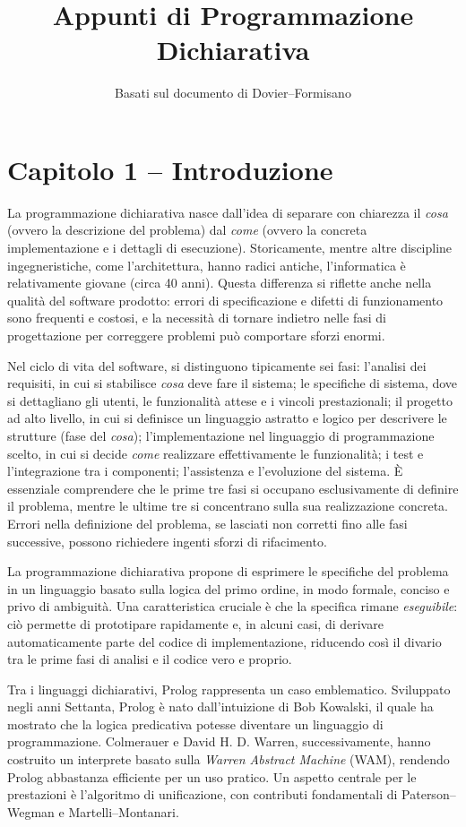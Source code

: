 \documentclass[12pt]{article}
\title{Appunti di Programmazione Dichiarativa}
\author{Basati sul documento di Dovier–Formisano}
\date{}
\begin{document}
\maketitle

\section*{Capitolo 1 – Introduzione}

La programmazione dichiarativa nasce dall'idea di separare con chiarezza il \emph{cosa} (ovvero la descrizione del problema) dal \emph{come} (ovvero la concreta implementazione e i dettagli di esecuzione). Storicamente, mentre altre discipline ingegneristiche, come l'architettura, hanno radici antiche, l'informatica è relativamente giovane (circa 40 anni). Questa differenza si riflette anche nella qualità del software prodotto: errori di specificazione e difetti di funzionamento sono frequenti e costosi, e la necessità di tornare indietro nelle fasi di progettazione per correggere problemi può comportare sforzi enormi. 

Nel ciclo di vita del software, si distinguono tipicamente sei fasi: 
l'analisi dei requisiti, in cui si stabilisce \emph{cosa} deve fare il sistema; 
le specifiche di sistema, dove si dettagliano gli utenti, le funzionalità attese e i vincoli prestazionali; 
il progetto ad alto livello, in cui si definisce un linguaggio astratto e logico per descrivere le strutture (fase del \emph{cosa}); 
l'implementazione nel linguaggio di programmazione scelto, in cui si decide \emph{come} realizzare effettivamente le funzionalità; 
i test e l'integrazione tra i componenti; 
l'assistenza e l'evoluzione del sistema. 
È essenziale comprendere che le prime tre fasi si occupano esclusivamente di definire il problema, mentre le ultime tre si concentrano sulla sua realizzazione concreta. Errori nella definizione del problema, se lasciati non corretti fino alle fasi successive, possono richiedere ingenti sforzi di rifacimento.

La programmazione dichiarativa propone di esprimere le specifiche del problema in un linguaggio basato sulla logica del primo ordine, in modo formale, conciso e privo di ambiguità. Una caratteristica cruciale è che la specifica rimane \emph{eseguibile}: ciò permette di prototipare rapidamente e, in alcuni casi, di derivare automaticamente parte del codice di implementazione, riducendo così il divario tra le prime fasi di analisi e il codice vero e proprio.

Tra i linguaggi dichiarativi, Prolog rappresenta un caso emblematico. Sviluppato negli anni Settanta, Prolog è nato dall'intuizione di Bob Kowalski, il quale ha mostrato che la logica predicativa potesse diventare un linguaggio di programmazione. Colmerauer e David H. D. Warren, successivamente, hanno costruito un interprete basato sulla \emph{Warren Abstract Machine} (WAM), rendendo Prolog abbastanza efficiente per un uso pratico. Un aspetto centrale per le prestazioni è l'algoritmo di unificazione, con contributi fondamentali di Paterson–Wegman e Martelli–Montanari.
\end{document}
